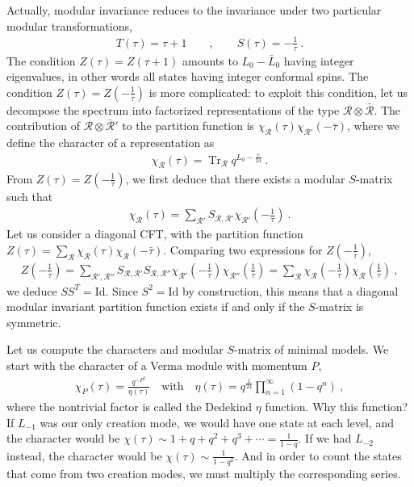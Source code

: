 \documentclass[12pt, a4paper]{article}
\theoremstyle{break}
\begin{document}
Actually, modular invariance reduces to the invariance under two particular modular transformations,
\begin{align}
 T(\tau) = \tau + 1 \qquad , \qquad S(\tau) = -\frac{1}{\tau}\ .
\end{align}
The condition $Z(\tau)=Z(\tau+1)$ amounts to $L_0-\bar{L}_0$ having integer eigenvalues, in other words all states having integer conformal spins.
The condition $Z(\tau)=Z(-\frac{1}{\tau})$ is more complicated: to exploit this condition, let us decompose the spectrum into factorized representations of the type $\mathcal{R}\otimes \bar{\mathcal{R}}$. 
The contribution of $\mathcal{R}\otimes \bar{\mathcal{R}}'$ to the partition function is $\chi_{\mathcal{R}}(\tau) \chi_{\mathcal{R}'}(-\bar\tau)$, where we define the character of a representation as
\begin{align}
 \chi_\mathcal{R}(\tau) = \operatorname{Tr}_\mathcal{R} q^{L_0-\frac{c}{24}}\ .
\end{align}
From $Z(\tau)=Z(-\frac{1}{\tau})$, we first deduce that there exists a modular $S$-matrix such that 
\begin{align}
 \chi_\mathcal{R}(\tau) = \sum_{\mathcal{R}'} S_{\mathcal{R},\mathcal{R}'} \chi_{\mathcal{R}'}(-\tfrac{1}{\tau})\ .
\end{align}
Let us consider a diagonal CFT, with the partition function $Z(\tau)=\sum_\mathcal{R} \chi_\mathcal{R}(\tau)\chi_{\mathcal{R}}(-\bar{\tau})$.
Comparing two expressions for $Z(-\frac{1}{\tau})$, 
\begin{align}
Z(-\tfrac{1}{\tau}) = \sum_{\mathcal{R}',\mathcal{R}''} S_{\mathcal{R},\mathcal{R}'} S_{\mathcal{R},\mathcal{R}''} \chi_{\mathcal{R}'}(-\tfrac{1}{\tau}) \chi_{\mathcal{R}''}(\tfrac{1}{\bar\tau}) = \sum_{\mathcal{R}} \chi_{\mathcal{R}}(-\tfrac{1}{\tau}) \chi_{\mathcal{R}}(\tfrac{1}{\bar\tau})\ ,
\end{align}
we deduce $SS^T=\text{Id}$. Since $S^2=\text{Id}$ by construction, this means that a diagonal modular invariant partition function exists if and only if the $S$-matrix is symmetric.

Let us compute the characters and modular $S$-matrix of minimal models. We start with the character of a Verma module with momentum $P$,
\begin{align}
 \chi_P(\tau) = \frac{q^{-P^2}}{\eta(\tau)} \quad \text{with} \quad \eta(\tau) = q^{\frac{1}{24}} \prod_{n=1}^\infty (1-q^n)\ ,
\end{align}
where the nontrivial factor is called the Dedekind $\eta$ function. Why this function? If $L_{-1}$ was our only creation mode, we would have one state at each level, and the character would be $\chi(\tau)\sim 1+q+q^2+q^3+\cdots = \frac{1}{1-q}$. If we had $L_{-2}$ instead, the character would be $\chi(\tau)\sim \frac{1}{1-q^2}$. And in order to count the states that come from two creation modes, we must multiply the corresponding series.
\end{document}
